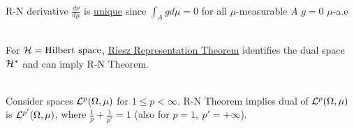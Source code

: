 \begin{remark}\ \\
R-N derivative $\frac{d\nu}{d\mu}$ is \underline{unique} since $\int_A g d\mu = 0$ for all $\mu$-measurable $A$ \imply $g = 0$ $\mu$-a.e
\end{remark}

\begin{remark}\ \\
For $\mathcal{H} = \text{Hilbert space}$, \hyperref[RRT]{Riesz Representation Theorem} identifies the dual space $\mathcal{H}^*$ and can imply R-N Theorem.
\end{remark}

\begin{corollary}\ \\   
Consider spaces $\mathcal{L}^p(\Omega, \mu)$ for
$1 \leq p < \infty$. R-N Theorem implies dual of $\mathcal{L}^p(\Omega, \mu)$ is $\mathcal{L}^{p'}(\Omega, \mu)$, where $\frac{1}{p} + \frac{1}{p'} = 1$ (also for $p=1,\ p' = +\infty$).
\end{corollary}
